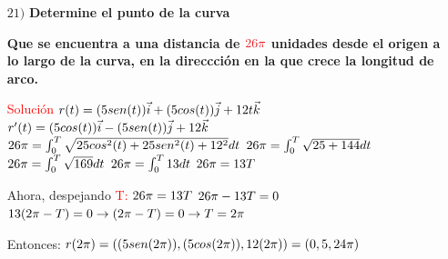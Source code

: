 \documentclass[12pt, letter-paper]{article}
\begin{document}
\begin{enumerate}
    \newpage
     \item [$21)$]
     \normalsize{\textbf{Determine el punto de la curva}}\par
     \vspace{0.5cm}
     \normalsize{\par}
     \vspace{0.5cm}
     \normalsize{\textbf{Que se encuentra a una distancia de $\textcolor{Red}{26\pi}$  unidades desde el origen a lo largo de la curva, en la direccción en la que crece la longitud de arco. }\par}
     \vspace{0.5cm}
    \large{\textcolor{red}{Solución}}
    \vspace{0.5cm}
    $\\r(t) = (5sen(t))\vec{i} + (5cos(t))\vec{j} + 12t\vec{k}$
    \vspace{0.5cm}
    $\\r'(t) = (5cos(t))\vec{i} - (5sen(t))\vec{j} + 12\vec{k}$
    \vspace{0.5cm}
    $\\26\pi= \int_{0}^{T}\sqrt{25cos^2(t) + 25sen^2(t)+12^2} dt$
    \vspace{0.5cm}
    $\\26\pi= \int_{0}^{T}\sqrt{25+144} dt$
    \vspace{0.5cm}
    $\\26\pi= \int_{0}^{T}\sqrt{169} dt$
    \vspace{0.5cm}
    $\\26\pi= \int_{0}^{T}13 dt$
    \vspace{0.5cm}
    $\\26\pi= 13T$
    \vspace{0.5cm}\par
    \normalsize{Ahora, despejando \textcolor{Red}{T:}}
    \vspace{0.5cm}
    \large{$\\26\pi= 13T$}
    \vspace{0.5cm}
    $\\26\pi - 13T = 0$
    \vspace{0.5cm}
    $\\13(2\pi-T) = 0\rightarrow (2\pi-T) = 0\rightarrow T=2\pi$
    \vspace{0.5cm}\par
    \normalsize{Entonces:}
    \vspace{0.5cm}
    \large{$\\r(2\pi) = ((5sen(2\pi)) , (5cos(2\pi)) , 12(2\pi)) = (0 , 5, 24\pi)$}
    \vspace{1cm}
    

\end{enumerate}
\end{document}
